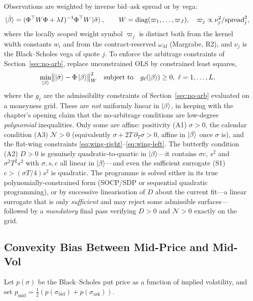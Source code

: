 \documentclass[11pt]{book}
\theoremstyle{plain}
\theoremstyle{definition}
\theoremstyle{remark}
\newcommand{\ket}[1]{\mathinner{\lvert #1 \rangle}}
\newcommand{\parket}{\ket{\beta}}                %
\newcommand{\vega}{\nu}                          %
\newcommand{\omM}{\omega_M}                      %
\begin{document}
Observations are weighted by inverse bid--ask spread or by vega:
\begin{equation}\label{eq:wls}
\ket{\hat\beta} = (\Phi^\top W \Phi + \lambda I)^{-1}\Phi^\top W\ket{\hat\sigma},
\qquad
W = \mathrm{diag}(\varpi_1,\ldots,\varpi_J),
\quad \varpi_j \propto \vega_j^2/\mathrm{spread}_j^2,
\end{equation}
where the locally scoped weight symbol $\varpi_j$ is distinct both from the
kernel width constants $w_i$ and from the contract-reserved $\omM$ (Margrabe,
R2), and $\vega_j$ is the Black--Scholes vega of quote $j$. To
enforce the arbitrage constraints of Section~\ref{sec:no-arb}, replace
unconstrained OLS by constrained least squares,
\[
\min_{\parket} \bigl\| \ket{\hat\sigma} - \Phi\parket \bigr\|_W^2
\quad\text{subject to}\quad g_\ell(\parket)\ge 0,\ \ell=1,\dots,L,
\]
where the $g_\ell$ are the admissibility constraints of
Section~\ref{sec:no-arb} evaluated on a moneyness grid. These are \emph{not}
uniformly linear in $\parket$, in keeping with the chapter's opening claim that
the no-arbitrage conditions are low-degree \emph{polynomial} inequalities. Only
some are affine: positivity (A1) $\sigma>0$, the calendar condition (A3)
$\mathcal N>0$ (equivalently $\sigma+2T\,\partial_T\sigma>0$, affine in $\parket$
once $\sigma$ is), and the flat-wing constraints
\eqref{eq:wing-right}--\eqref{eq:wing-left}. The butterfly condition (A2) $D>0$
is genuinely quadratic-to-quartic in $\parket$---it contains $\sigma c$, $s^2$
and $\sigma^2 T^2 s^2$ with $\sigma,s,c$ all linear in $\parket$---and even the
sufficient surrogate (S1) $c>(\sigma T/4)s^2$ is quadratic. The programme is
solved either in its true polynomially-constrained form (SOCP/SDP or
sequential quadratic programming), or by successive linearisation of $D$
about the current fit---a linear surrogate that is only \emph{sufficient} and
may reject some admissible surfaces---followed by a \emph{mandatory} final pass
verifying $D>0$ and $\mathcal N>0$ exactly on the grid.

\subsection{Convexity Bias Between Mid-Price and Mid-Vol}
\label{sec:convexity}

Let $p(\sigma)$ be the Black--Scholes put price as a function of implied
volatility, and set $p_{\mathrm{mid}} = \tfrac12(p(\sigma_{\mathrm{bid}}) +
p(\sigma_{\mathrm{ask}}))$.
\end{document}
